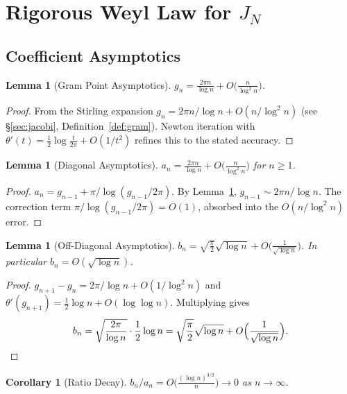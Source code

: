 \documentclass{pre-aomart}
\theoremstyle{plain}
\newtheorem{lemma}[theorem]{Lemma}
\newtheorem{corollary}[theorem]{Corollary}
\theoremstyle{definition}
\theoremstyle{remark}
\begin{document}
\section{Rigorous Weyl Law for \texorpdfstring{$J_N$}{J\_N}}
\label{sec:weyl_proof}

\subsection*{Coefficient Asymptotics}

\begin{lemma}[Gram Point Asymptotics]\label{lem:gram_asymp_app}
$g_n = \frac{2\pi n}{\log n} + O\bigl(\frac{n}{\log^2 n}\bigr)$.
\end{lemma}

\begin{proof}
From the Stirling expansion $g_n = 2\pi n/\log n + O(n/\log^2 n)$ (see
\S\ref{sec:jacobi}, Definition~\ref{def:gram}).  Newton iteration with
$\theta'(t) = \frac12\log\frac{t}{2\pi} + O(1/t^2)$ refines this to the
stated accuracy.
\end{proof}

\begin{lemma}[Diagonal Asymptotics]\label{lem:diag_app}
$a_n = \frac{2\pi n}{\log n} + O\bigl(\frac{n}{\log^2 n}\bigr)$ for $n \ge 1$.
\end{lemma}

\begin{proof}
$a_n = g_{n-1} + \pi/\log(g_{n-1}/2\pi)$.  By Lemma~\ref{lem:gram_asymp_app},
$g_{n-1} \sim 2\pi n/\log n$.  The correction term $\pi/\log(g_{n-1}/2\pi)
= O(1)$, absorbed into the $O(n/\log^2 n)$ error.
\end{proof}

\begin{lemma}[Off-Diagonal Asymptotics]\label{lem:offdiag_app}
$b_n = \sqrt{\frac{\pi}{2}}\sqrt{\log n} + O\bigl(\frac{1}{\sqrt{\log n}}\bigr)$.
In particular $b_n = O(\sqrt{\log n})$.
\end{lemma}

\begin{proof}
$g_{n+1} - g_n = 2\pi/\log n + O(1/\log^2 n)$ and
$\theta'(g_{n+1}) = \frac12\log n + O(\log\log n)$.  Multiplying gives
\[
b_n = \sqrt{\frac{2\pi}{\log n}}\cdot\frac12\log n = \sqrt{\frac{\pi}{2}}\sqrt{\log n}
+ O\Bigl(\frac{1}{\sqrt{\log n}}\Bigr).
\]
\end{proof}

\begin{corollary}[Ratio Decay]\label{cor:ratio}
$b_n/a_n = O\bigl(\frac{(\log n)^{3/2}}{n}\bigr) \to 0$ as $n \to \infty$.
\end{corollary}
\end{document}
